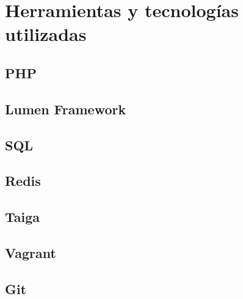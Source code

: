 \section{Herramientas y tecnologías utilizadas}

\subsection{PHP}

\subsection{Lumen Framework}

\subsection{SQL}

\subsection{Redis}

\subsection{Taiga}

\subsection{Vagrant}

\subsection{Git}